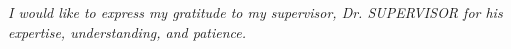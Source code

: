 


\begin{flushright}
\textit{I would like to express my gratitude to my supervisor, Dr. SUPERVISOR for his expertise, understanding, and patience.}\\
\end{flushright}